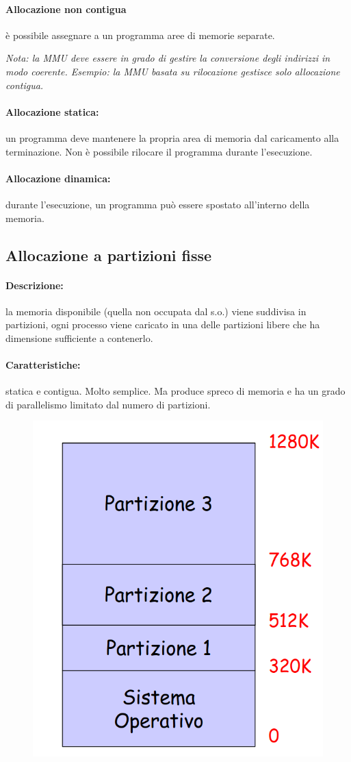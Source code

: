 \paragraph{Allocazione non contigua} è possibile assegnare a un programma aree di memorie separate.

\textit{Nota: la MMU deve essere in grado di gestire la conversione degli indirizzi in modo coerente. Esempio: la MMU basata su rilocazione gestisce solo allocazione contigua.}

\paragraph{Allocazione statica:} un programma deve mantenere la propria area di memoria dal caricamento alla terminazione. Non è possibile rilocare il programma durante l'esecuzione.
\paragraph{Allocazione dinamica:} durante l'esecuzione, un programma può essere spostato all'interno della memoria.

\subsection{Allocazione a partizioni fisse}
\paragraph{Descrizione:} la memoria disponibile (quella non occupata dal s.o.) viene suddivisa in partizioni, ogni processo viene caricato in una delle partizioni libere che ha dimensione sufficiente a contenerlo.

\paragraph{Caratteristiche:} statica e contigua. Molto semplice.
Ma produce spreco di memoria e ha un grado di parallelismo limitato dal numero di partizioni.

\begin{figure} [h]
    \centering
    \includegraphics[width=0.3\linewidth]{Images/Screenshot 2025-01-16 at 19-02-29 so-05-memoria - so-05-memoria.pdf.png}
\end{figure}

